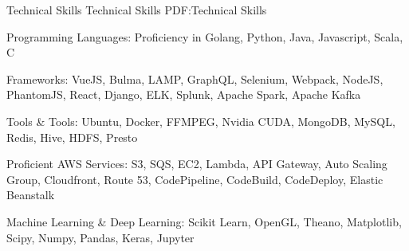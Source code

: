 \documentclass[letterpaper,MMMyyyy,nonstopmode]{simpleresumecv}
\begin{document}
\begin{Body}







\Section
{Technical Skills}
{Technical Skills}
{PDF:Technical Skills}

\BulletItem
Programming Languages: Proficiency in Golang, Python, Java, Javascript, Scala, C

\Gap
\BulletItem
Frameworks: VueJS, Bulma, LAMP, GraphQL, Selenium, Webpack, NodeJS, PhantomJS, React, Django, ELK, Splunk, Apache Spark, Apache Kafka

\Gap
\BulletItem
Tools \& Tools: Ubuntu, Docker, FFMPEG, Nvidia CUDA, MongoDB, MySQL, Redis, Hive, HDFS, Presto

\Gap
\BulletItem
Proficient AWS Services: S3, SQS, EC2, Lambda, API Gateway, Auto Scaling Group, Cloudfront, Route 53, CodePipeline, CodeBuild, CodeDeploy, Elastic Beanstalk

\Gap
\BulletItem
Machine Learning \& Deep Learning: Scikit Learn, OpenGL, Theano, Matplotlib, Scipy, Numpy, Pandas, Keras, Jupyter

\end{Body}
\end{document}
